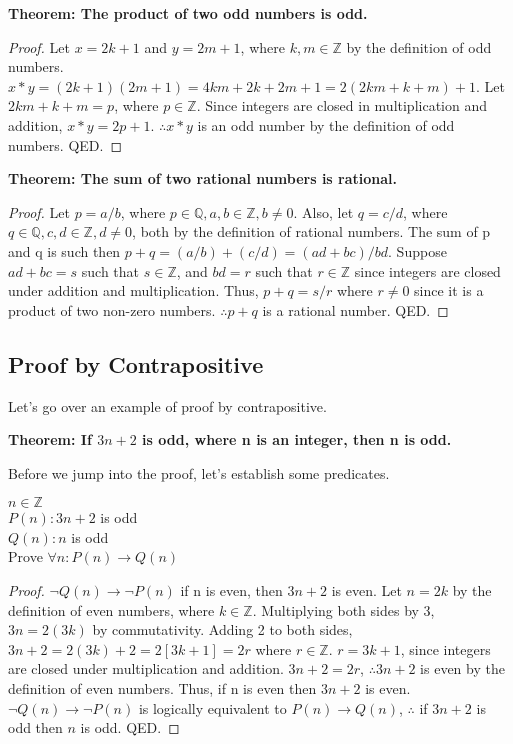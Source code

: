 \begin{example}
    \textbf{Theorem: The product of two odd numbers is odd.}
\end{example}

\begin{proof}
Let $x=2k+1$ and $y=2m+1$, where $k,m \in \mathbb{Z}$ by the definition of odd numbers. $x*y=(2k+1)(2m+1)=4km+2k+2m+1=2(2km+k+m)+1$. Let $2km+k+m=p$, where $p\in \mathbb{Z}$. Since integers are closed in multiplication and addition, $x*y=2p+1$. $\therefore x*y$ is an odd number by the definition of odd numbers. QED.
\end{proof}

\begin{example}
    \textbf{Theorem: The sum of two rational numbers is rational.}
\end{example}

\begin{proof}
    Let $p=a/b$, where $p \in \mathbb{Q}, a,b \in \mathbb{Z}, b \neq 0$. Also, let $q=c/d$, where $q \in \mathbb{Q}, c,d \in \mathbb{Z}, d \neq 0$, both by the definition of rational numbers. The sum of p and q is such then $p+q=(a/b)+(c/d)=(ad+bc)/bd$. Suppose $ad+bc=s$ such that $s \in \mathbb{Z}$, and $bd=r$ such that $r \in \mathbb{Z}$ since integers are closed under addition and multiplication. Thus, $p+q=s/r$ where $r\neq 0$ since it is a product of two non-zero numbers. $\therefore p+q$ is a rational number. QED. 
\end{proof}

\newpage

\subsection{Proof by Contrapositive}
Let's go over an example of proof by contrapositive.

\begin{example}
    \textbf{Theorem: If $3n+2$ is odd, where n is an integer, then n is odd.}
\end{example}

Before we jump into the proof, let's establish some predicates.

\begin{center}
$n \in \mathbb{Z}$\\
$P(n): 3n+2$ is odd\\
$Q(n): n$ is odd\\
Prove $\forall n : P(n) \rightarrow Q(n)$
\end{center}

\begin{proof}
$\neg Q(n) \rightarrow \neg P(n)$ if n is even, then $3n+2$ is even. Let $n=2k$ by the definition of even numbers, where $k\in \mathbb{Z}$. Multiplying both sides by 3, $3n=2(3k)$ by commutativity. Adding 2 to both sides, $3n+2=2(3k)+2=2[3k+1]=2r$ where $r\in \mathbb{Z}$. $r=3k+1$, since integers are closed under multiplication and addition. $3n+2=2r$, $\therefore 3n+2$ is even by the definition of even numbers. Thus, if n is even then $3n+2$ is even. $\neg Q(n) \rightarrow \neg P(n)$ is logically equivalent to $P(n) \rightarrow Q(n)$, $\therefore$ if $3n+2$ is odd then $n$ is odd. QED.
\end{proof}